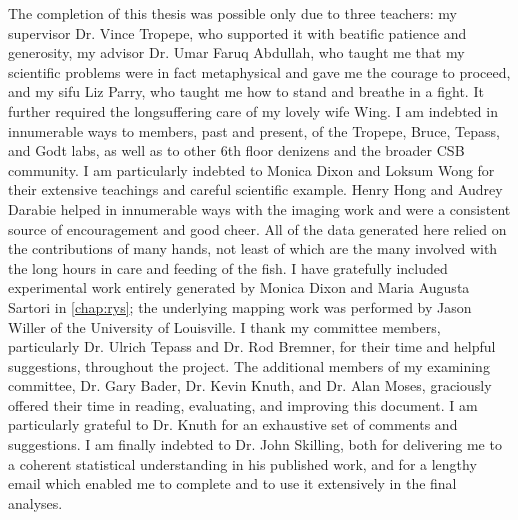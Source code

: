 \documentclass{ut-thesis}
\begin{document}
\begin{preliminary}
\begin{acknowledgements}
The completion of this thesis was possible only due to three teachers: my supervisor Dr. Vince Tropepe, who supported it with beatific patience and generosity, my advisor Dr. Umar Faruq Abdullah, who taught me that my scientific problems were in fact metaphysical and gave me the courage to proceed, and my sifu Liz Parry, who taught me how to stand and breathe in a fight. It further required the longsuffering care of my lovely wife Wing. I am indebted in innumerable ways to members, past and present, of the Tropepe, Bruce, Tepass, and Godt labs, as well as to other 6th floor denizens and the broader CSB community. I am particularly indebted to Monica Dixon and Loksum Wong for their extensive teachings and careful scientific example. Henry Hong and Audrey Darabie helped in innumerable ways with the imaging work and were a consistent source of encouragement and good cheer. All of the data generated here relied on the contributions of many hands, not least of which are the many involved with the long hours in care and feeding of the fish. I have gratefully included experimental work entirely generated by Monica Dixon and Maria Augusta Sartori in \autoref{chap:rys}; the underlying mapping work was performed by Jason Willer of the University of Louisville. I thank my committee members, particularly Dr. Ulrich Tepass and Dr. Rod Bremner, for their time and helpful suggestions, throughout the project. The additional members of my examining committee, Dr. Gary Bader, Dr. Kevin Knuth, and Dr. Alan Moses, graciously offered their time in reading, evaluating, and improving this document. I am particularly grateful to Dr. Knuth for an exhaustive set of comments and suggestions. I am finally indebted to Dr. John Skilling, both for delivering me to a coherent statistical understanding in his published work, and for a lengthy email which enabled me to complete  and to use it extensively in the final analyses.
\end{acknowledgements}

\tableofcontents

\listoftables

\listoffigures


\end{preliminary}
\end{document}

